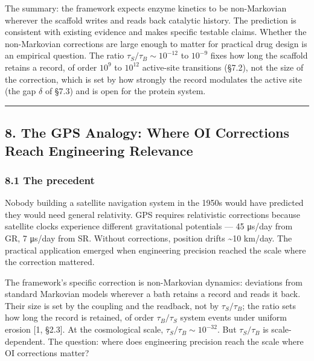\documentclass[
]{article}
\begin{document}
The summary: the framework expects enzyme kinetics to be non-Markovian
wherever the scaffold writes and reads back catalytic history. The
prediction is consistent with existing evidence and makes specific
testable claims. Whether the non-Markovian corrections are large enough
to matter for practical drug design is an empirical question. The ratio
\(\tau_S / \tau_B \sim 10^{-12}\) to \(10^{-9}\) fixes how long the
scaffold retains a record, of order \(10^{9}\) to \(10^{12}\)
active-site transitions (§7.2), not the size of the correction, which is
set by how strongly the record modulates the active site (the gap
\(\delta\) of §7.3) and is open for the protein system.

\begin{center}\rule{0.5\linewidth}{0.5pt}\end{center}

\hypertarget{the-gps-analogy-where-oi-corrections-reach-engineering-relevance}{%
\subsection{8. The GPS Analogy: Where OI Corrections Reach Engineering
Relevance}\label{the-gps-analogy-where-oi-corrections-reach-engineering-relevance}}

\hypertarget{the-precedent}{%
\subsubsection{8.1 The precedent}\label{the-precedent}}

Nobody building a satellite navigation system in the 1950s would have
predicted they would need general relativity. GPS requires relativistic
corrections because satellite clocks experience different gravitational
potentials --- 45 μs/day from GR, 7 μs/day from SR. Without corrections,
position drifts \textasciitilde10 km/day. The practical application
emerged when engineering precision reached the scale where the
correction mattered.

The framework's specific correction is non-Markovian dynamics:
deviations from standard Markovian models wherever a bath retains a
record and reads it back. Their size is set by the coupling and the
readback, not by \(\tau_S / \tau_B\); the ratio sets how long the record
is retained, of order \(\tau_B / \tau_S\) system events under uniform
erosion {[}1, §2.3{]}. At the cosmological scale,
\(\tau_S / \tau_B \sim 10^{-32}\). But \(\tau_S / \tau_B\) is
scale-dependent. The question: where does engineering precision reach
the scale where OI corrections matter?
\end{document}
